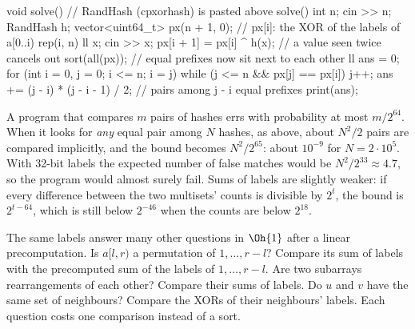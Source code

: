 \begin{code}
void solve() {  // RandHash (cpxorhash) is pasted above solve()
    int n;
    cin >> n;
    RandHash h;
    vector<uint64_t> px(n + 1, 0);  // px[i]: the XOR of the labels of a[0..i)
    rep(i, n) {
        ll x;
        cin >> x;
        px[i + 1] = px[i] ^ h(x);  // a value seen twice cancels out
    }
    sort(all(px));  // equal prefixes now sit next to each other
    ll ans = 0;
    for (int i = 0, j = 0; i <= n; i = j) {
        while (j <= n && px[j] == px[i]) j++;
        ans += (j - i) * (j - i - 1) / 2;  // pairs among j - i equal prefixes
    }
    print(ans);
}
\end{code}


\begin{tip}
A program that compares $m$ pairs of hashes errs with probability at most $m / 2^{64}$. When it looks for \emph{any} equal pair among
$N$ hashes, as above, about $N^2 / 2$ pairs are compared implicitly, and the bound becomes $N^2 / 2^{65}$: about $10^{-9}$ for $N = 2
\cdot 10^5$. With 32-bit labels the expected number of false matches would be $N^2 / 2^{33} \approx 4.7$, so the program would almost
surely fail. Sums of labels are slightly weaker: if every difference between the two multisets' counts is divisible by $2^t$, the
bound is $2^{t - 64}$, which is still below $2^{-46}$ when the counts are below $2^{18}$.
\end{tip}

The same labels answer many other questions in $\Oh{1}$ after a linear precomputation. Is $a[l, r)$ a permutation of $1, \dots, r - l$?
Compare its sum of labels with the precomputed sum of the labels of $1, \dots, r - l$. Are two subarrays rearrangements of each other?
Compare their sums of labels. Do $u$ and $v$ have the same set of neighbours? Compare the XORs of their neighbours' labels. Each
question costs one comparison instead of a sort.

